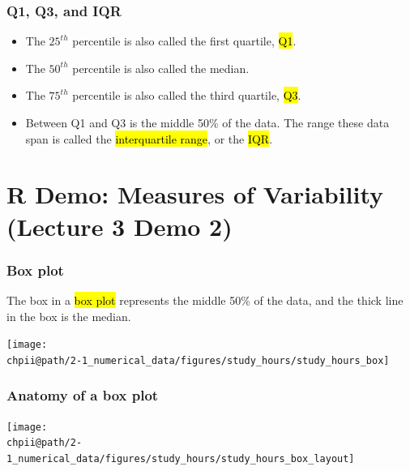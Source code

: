 \documentclass[slidestop,compress,mathserif]{beamer}
\makeatletter
\def\chpii@path{../../Chp 2}
\makeatother
\begin{document}
\begin{frame}[fragile]
\frametitle{Q1, Q3, and IQR}

\begin{itemize}

\item The $25^{th}$ percentile is also called the first quartile, \hl{Q1}.

\item The $50^{th}$ percentile is also called the median.

\item The $75^{th}$ percentile is also called the third quartile, \hl{Q3}.

\item Between Q1 and Q3 is the middle 50\% of the data. The range these data span is called the \hl{interquartile range}, or the \hl{IQR}.
\formula{\[ IQR = Q3 - Q1 \]}
\end{itemize}

\end{frame}

\section{R Demo: Measures of Variability (Lecture 3 Demo 2)}


\begin{frame}
\frametitle{Box plot}

The box in a \hl{box plot} represents the middle 50\% of the data, and the thick line in the box is the median.

\begin{center}
\texttt{[image: \\chpii@path/2-1\_numerical\_data/figures/study\_hours/study\_hours\_box]}
\end{center}

\end{frame}


\begin{frame}
\frametitle{Anatomy of a box plot}

\begin{center}
\texttt{[image: \\chpii@path/2-1\_numerical\_data/figures/study\_hours/study\_hours\_box\_layout]}
\end{center}

\end{frame}
\end{document}
